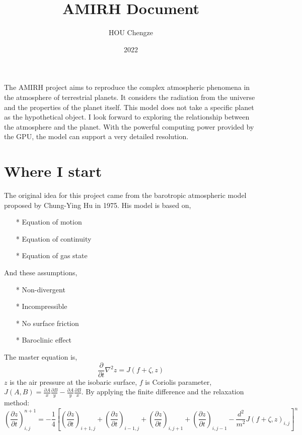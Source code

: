 \documentclass{article}
\title{AMIRH Document}
\author{HOU Chengze}
\date{2022}
\begin{document}
\begin{sloppypar}
\maketitle
The AMIRH project aims to reproduce the complex atmospheric phenomena in the atmosphere of terrestrial planets.
It considers the radiation from the universe and the properties of the planet itself.
This model does not take a specific planet as the hypothetical object. I look forward to exploring the relationship between the atmosphere and the planet.
With the powerful computing power provided by the GPU, the model can support a very detailed resolution.

\section{Where I start}
The original idea for this project came from the barotropic atmospheric model
proposed by Chung-Ying Hu in 1975. His model is based on,\newline
\begin{itemize}
    \item [*] Equation of motion
    \item [*] Equation of continuity
    \item [*] Equation of gas state
\end{itemize}
And these assumptions,\newline
\begin{itemize}
    \item [*] Non-divergent
    \item [*] Incompressible
    \item [*] No surface friction
    \item [*] Baroclinic effect
\end{itemize}
The master equation is,
\begin{equation}
    \frac{\partial}{\partial{t}}\nabla^{2}z=J(f+\zeta, z)
\end{equation}
$z$ is the air pressure at the isobaric surface, $f$ is Coriolis parameter, $J(A, B)=\frac{\partial A}{x}\frac{\partial B}{y}-\frac{\partial A}{y}\frac{\partial B}{x}$. By applying the finite difference and the relaxation
method:\newline
\begin{equation}
    (\frac{\partial{z}}{\partial{t}})^{n+1}_{i,j} =-\frac{1}{4} [ (\frac{\partial{z}}{\partial{t}})_{i+1,j}+ (\frac{\partial{z}}{\partial{t}})_{i-1,j}+ (\frac{\partial{z}}{\partial{t}})_{i,j+1}+ (\frac{\partial{z}}{\partial{t}})_{i,j-1}- \frac{d^2}{m^2}J(f+\zeta, z)_{i,j} ]^n

\end{equation}
\end{sloppypar}
\end{document}
